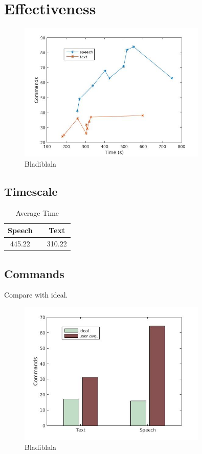 \section{Effectiveness}

\begin{figure}[p]
  \centering
  \includegraphics[width=0.8\textwidth]{images/time_cmd.jpg} %
  \caption{Bladiblala}\label{time_cmd}
\end{figure}

\subsection{Timescale}

\begin{table}[h!]
  \centering
  \begin{tabular}{ccc}
    \toprule
    Speech &   & Text\\
    \midrule
    445.22 &   & 310.22\\
    \bottomrule
  \end{tabular}
  \caption{Average Time}\label{avg_time}
\end{table}

\subsection{Commands}
Compare with ideal.

\begin{figure}[h!]
  \centering
  \includegraphics[width=0.8\textwidth]{images/ideal_cmd.jpg}
  \caption{Bladiblala}\label{ideal_cmd}
\end{figure}

